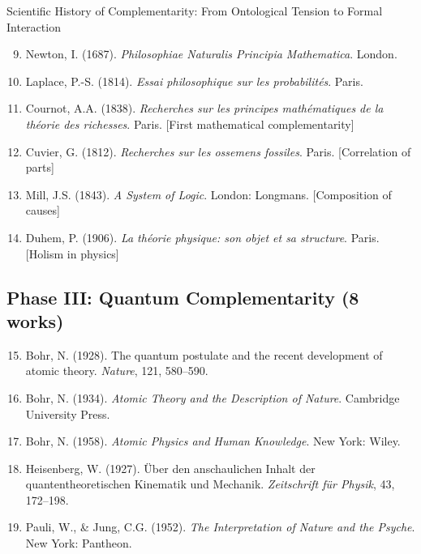 \begin{chapter}{Scientific History of Complementarity: From Ontological Tension to Formal Interaction}
\begin{enumerate}
    \setcounter{enumi}{8}
    \item Newton, I. (1687). \textit{Philosophiae Naturalis Principia Mathematica}. London.

    \item Laplace, P.-S. (1814). \textit{Essai philosophique sur les probabilités}. Paris.

    \item Cournot, A.A. (1838). \textit{Recherches sur les principes mathématiques de la théorie des richesses}. Paris. [First mathematical complementarity]

    \item Cuvier, G. (1812). \textit{Recherches sur les ossemens fossiles}. Paris. [Correlation of parts]

    \item Mill, J.S. (1843). \textit{A System of Logic}. London: Longmans. [Composition of causes]

    \item Duhem, P. (1906). \textit{La théorie physique: son objet et sa structure}. Paris. [Holism in physics]
\end{enumerate}

\subsection{Phase III: Quantum Complementarity (8 works)}

\begin{enumerate}
    \setcounter{enumi}{14}
    \item Bohr, N. (1928). The quantum postulate and the recent development of atomic theory. \textit{Nature}, 121, 580--590.

    \item Bohr, N. (1934). \textit{Atomic Theory and the Description of Nature}. Cambridge University Press.

    \item Bohr, N. (1958). \textit{Atomic Physics and Human Knowledge}. New York: Wiley.

    \item Heisenberg, W. (1927). Über den anschaulichen Inhalt der quantentheoretischen Kinematik und Mechanik. \textit{Zeitschrift für Physik}, 43, 172--198.

    \item Pauli, W., \& Jung, C.G. (1952). \textit{The Interpretation of Nature and the Psyche}. New York: Pantheon.


\end{enumerate}
\end{chapter}
